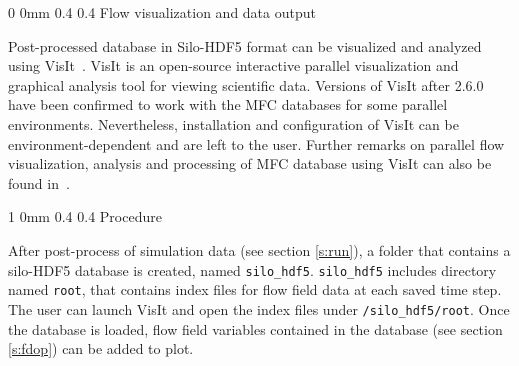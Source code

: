 \documentclass[11pt]{article}
\makeatletter
\renewcommand{\section}{\@startsection
{section}%
{0}%
{0mm}%
{0.4\baselineskip}%
{0.4\baselineskip}%
{\normalfont\Large\bfseries\color{myBrown}}}%
\renewcommand{\subsection}{\@startsection
{subsection}%
{1}%
{0mm}%
{0.4\baselineskip}%
{0.4\baselineskip}%
{\normalfont\large\bfseries\color{myBrown}}}%
\makeatother
\begin{document}

\section{Flow visualization and data output}\label{s:vis}

Post-processed database in Silo-HDF5 format can be visualized and analyzed using VisIt~\citep{visit}.
VisIt is an open-source interactive parallel visualization and graphical analysis tool for viewing scientific data.
Versions of VisIt after 2.6.0 have been confirmed to work with the MFC databases for some parallel environments.
Nevertheless, installation and configuration of VisIt can be environment-dependent and are left to the user.
Further remarks on parallel flow visualization, analysis and processing of MFC database using VisIt can also be found in~\citet{Coralic15,Meng16}.


\subsection{Procedure}

After post-process of simulation data (see section \ref{s:run}), a folder that contains a silo-HDF5 database is created, named \texttt{silo_hdf5}.
\texttt{silo_hdf5} includes directory named \texttt{root}, that contains index files for flow field data at each saved time step.
The user can launch VisIt and open the index files under \texttt{/silo_hdf5/root}.
Once the database is loaded, flow field variables contained in the database (see section \ref{s:fdop}) can be added to plot.
\end{document}
